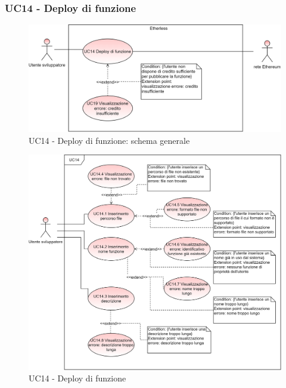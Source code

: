 \subsubsection{UC14 - Deploy di funzione}
\begin{figure}[h]
	\centering
	\includegraphics[scale=\ucs]{./res/img/UC14G.png}
	\caption {UC14 - Deploy di funzione: schema generale}
\end{figure}
\begin{figure}[H]
	\centering
	\includegraphics[scale=\ucs]{./res/img/UC14.png}
	\caption {UC14 - Deploy di funzione}
\end{figure}
